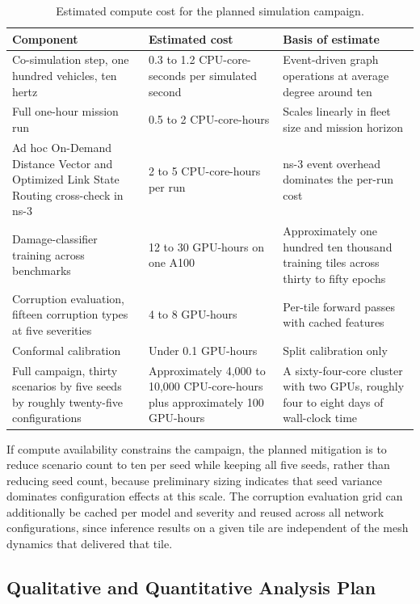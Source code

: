 \documentclass[drones,article,submit,moreauthors]{Definitions/mdpi}
\begin{document}
\begin{table}[H]
\caption{Estimated compute cost for the planned simulation campaign.}
\label{tab:compute}
\begin{tabular}{p{4.6cm}p{3.6cm}p{4.5cm}}
\toprule
\textbf{Component} & \textbf{Estimated cost} & \textbf{Basis of estimate} \\
\midrule
Co-simulation step, one hundred vehicles, ten hertz & 0.3 to 1.2 CPU-core-seconds per simulated second & Event-driven graph operations at average degree around ten \\
Full one-hour mission run & 0.5 to 2 CPU-core-hours & Scales linearly in fleet size and mission horizon \\
Ad hoc On-Demand Distance Vector and Optimized Link State Routing cross-check in ns-3 & 2 to 5 CPU-core-hours per run & ns-3 event overhead dominates the per-run cost \\
Damage-classifier training across benchmarks & 12 to 30 GPU-hours on one A100 & Approximately one hundred ten thousand training tiles across thirty to fifty epochs \\
Corruption evaluation, fifteen corruption types at five severities & 4 to 8 GPU-hours & Per-tile forward passes with cached features \\
Conformal calibration & Under 0.1 GPU-hours & Split calibration only \\
Full campaign, thirty scenarios by five seeds by roughly twenty-five configurations & Approximately 4{,}000 to 10{,}000 CPU-core-hours plus approximately 100 GPU-hours & A sixty-four-core cluster with two GPUs, roughly four to eight days of wall-clock time \\
\bottomrule
\end{tabular}
\end{table}

If compute availability constrains the campaign, the planned mitigation is to reduce scenario count to ten per seed while keeping all five seeds, rather than reducing seed count, because preliminary sizing indicates that seed variance dominates configuration effects at this scale. The corruption evaluation grid can additionally be cached per model and severity and reused across all network configurations, since inference results on a given tile are independent of the mesh dynamics that delivered that tile.

\subsection{Qualitative and Quantitative Analysis Plan}
\end{document}

